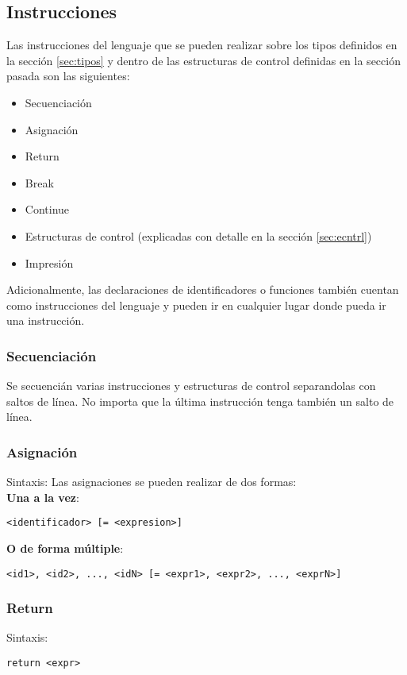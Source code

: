 \documentclass[12pt, spanish]{report}
\begin{document}
\subsection{Instrucciones}
\label{sec:instr}

Las instrucciones del lenguaje que se pueden realizar sobre los tipos
definidos en la secci\'on \ref{sec:tipos} y dentro de las estructuras de
control definidas en la secci\'on pasada son las siguientes:

\begin{itemize}
\item Secuenciaci\'on
\item Asignaci\'on
\item Return
\item Break
\item Continue
\item Estructuras de control (explicadas con detalle en la secci\'on \ref{sec:ecntrl})
\item Impresi\'on
\end{itemize}

Adicionalmente, las declaraciones de identificadores o funciones
tambi\'en cuentan como instrucciones del lenguaje y pueden ir en cualquier
lugar donde pueda ir una instrucci\'on.

\subsubsection{Secuenciaci\'on}
Se secuenci\'an varias instrucciones y estructuras de control separandolas con saltos
de l\'inea. No importa que la \'ultima instrucci\'on tenga
tambi\'en un salto de l\'inea.

\subsubsection{Asignaci\'on}
Sintaxis:
Las asignaciones se pueden realizar de dos formas:\\

\textbf{Una a la vez}:
\begin{verbatim}
<identificador> [= <expresion>]
\end{verbatim}

\textbf{O de forma m\'ultiple}:
\begin{verbatim}
<id1>, <id2>, ..., <idN> [= <expr1>, <expr2>, ..., <exprN>]
\end{verbatim}

\subsubsection{Return}
\label{sec:return}
Sintaxis:
\begin{verbatim}
return <expr>
\end{verbatim}
\end{document}
